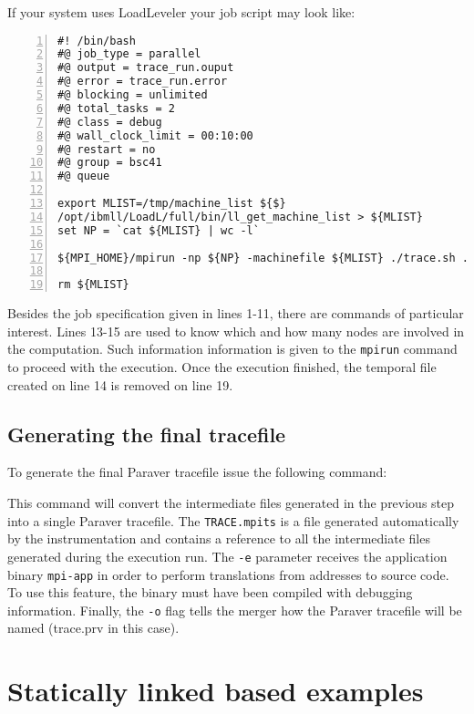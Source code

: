 If your system uses LoadLeveler your job script may look like:

\begin{Verbatim}[frame=single,numbers=left,labelposition=topline,label=ll.sh]
#! /bin/bash
#@ job_type = parallel
#@ output = trace_run.ouput
#@ error = trace_run.error
#@ blocking = unlimited
#@ total_tasks = 2
#@ class = debug
#@ wall_clock_limit = 00:10:00
#@ restart = no
#@ group = bsc41 
#@ queue

export MLIST=/tmp/machine_list ${$}
/opt/ibmll/LoadL/full/bin/ll_get_machine_list > ${MLIST}
set NP = `cat ${MLIST} | wc -l`

${MPI_HOME}/mpirun -np ${NP} -machinefile ${MLIST} ./trace.sh ./mpi-app

rm ${MLIST}
\end{Verbatim}

Besides the job specification given in lines 1-11, there are commands of particular interest. Lines 13-15 are used to know which and how many nodes are involved in the computation. Such information information is given to the {\tt mpirun} command to proceed with the execution. Once the execution finished, the temporal file created on line 14 is removed on line 19.

\subsection{Generating the final tracefile}\label{subsec:Examples_LDPRELOAD_Final}

To generate the final Paraver tracefile issue the following command:


This command will convert the intermediate files generated in the previous step into a single Paraver tracefile. The {\tt TRACE.mpits} is a file generated automatically by the instrumentation and contains a reference to all the intermediate files generated during the execution run. The {\tt -e} parameter receives the application binary {\tt mpi-app} in order to perform translations from addresses to source code. To use this feature, the binary must have been compiled with debugging information. Finally, the {\tt -o} flag tells the merger how the Paraver tracefile will be named (trace.prv in this case).

\section{Statically linked based examples}\label{sec:Examples_static}

